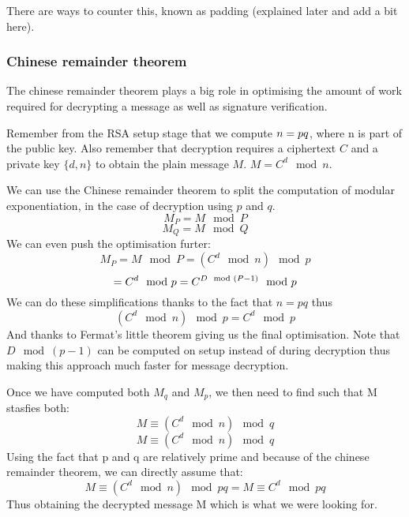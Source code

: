 \documentclass[conference]{IEEEtran}
\begin{document}
There are ways to counter this, known as padding (explained later and add a bit here).

\subsubsection{Chinese remainder theorem}
The chinese remainder theorem plays a big role in optimising 
the amount of work required for decrypting a message as well as 
signature verification.


Remember from the RSA setup stage that we compute 
$n = p\*q$, where n is part of the public key.
Also remember that decryption requires a ciphertext $C$ and
a private key $\{d,n\}$ to obtain the plain message $M$.
$M = C^{d}\mod n$.

We can use the Chinese remainder theorem to split the computation of
modular exponentiation, in the case of decryption using $p$ and $q$.
\begin{equation*}
    M_{P} = M\mod P
\end{equation*}
\begin{equation*}
    M_{Q} = M\mod Q
\end{equation*}
We can even push the optimisation furter:
\begin{equation*}
    M_{P} = M\mod P = (C^{d}\mod n)\mod p
\end{equation*}
\begin{equation*}
    = C^{d}\mod p\\ = C^{D\mod(P-1)}\mod p
\end{equation*}
We can do these simplifications thanks to the fact that $n = pq$ thus 
\begin{equation*}
    (C^{d}\mod n)\mod p = C^{d}\mod p
\end{equation*}
And thanks to Fermat's little theorem giving us the final optimisation.
Note that $D\mod(p - 1)$ can be computed on setup instead of during decryption
thus making this approach much faster for message decryption.

Once we have computed both $M_{q}$ and $M_{p}$, we then need to find such 
that M stasfies both:
\begin{equation*}
    M \equiv (C^{d}\mod n)\mod q
\end{equation*}
\begin{equation*}
    M \equiv (C^{d}\mod n)\mod q
\end{equation*}
Using the fact that p and q are relatively prime and because of the 
chinese remainder theorem, we can directly assume that:
\begin{equation*}
    M \equiv (C^{d}\mod n)\mod pq = M \equiv C^{d}\mod pq
\end{equation*}
Thus obtaining the decrypted message M which is what we were looking for.
\end{document}
